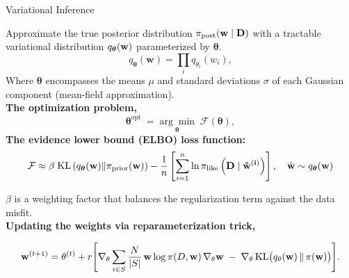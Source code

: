 \documentclass[8pt,xcolor=dvipsnames,compress]{beamer}
\newcommand{\bs}{\boldsymbol}
\begin{document}
%
\begin{frame}{Variational Inference}
\footnotesize

Approximate the true posterior distribution $\pi_{\text{post}}(\bf{w} \mid \bf{D})$ with a tractable variational distribution $q_{\boldsymbol{\theta}}(\bf{w})$ parameterized by $\boldsymbol{\theta}$.
\begin{equation}
q_{\boldsymbol{\theta}}(\mathbf{w}) = \prod_i q_{\theta_i}(w_i),
\end{equation}
Where $\boldsymbol{\theta}$ encompasses the means $\mu$ and standard deviations $\sigma$ of each Gaussian component (mean-field approximation).\\
\vspace{0.07in}
\textbf{The optimization problem,}
\begin{equation}\label{eq:f_opt}
\bs \theta^{\text {opt }}= \underset{\bs \theta}{\arg \min } \; \mathcal{F} (\bs \theta),
\end{equation}
\textbf{The evidence lower bound (ELBO) loss function:}
\begin{equation}\label{eq:elbo}
\mathcal{F} \approx \beta \; \mathrm{KL}\left( q_{\boldsymbol{\theta}}({\mathbf{w}}) \| \pi_{\text{prior}}({\bf w})\right)-\frac{1}{n} \left[\sum_{i=1}^{n} \ln \pi_{\text{like}}\left(\bf{D} \mid \hat{\bf{w}}^{(i)}\right)\right], \quad 
\hat{\bf{w}} \sim q_{\boldsymbol{\theta}}(\mathbf{w})
\end{equation}

$\beta$ is a weighting factor that balances the regularization term against the data misfit.\\
\vspace{0.07in}
\textbf{Updating the weights via reparameterization trick,}

\begin{equation}
{\bf w}^{(t+1)} = \theta^{(t)} + r \Biggl[
\nabla_{\theta} \sum_{i \in S} \frac{N}{|S|}\, {\bf w} \log \pi(D, {\bf w})\, \nabla_{\theta} {\bf w}
\;-\;
\nabla_{\theta}\, \mathrm{KL}\bigl(q_{\theta}({\bf w})\,\|\,\pi({\bf w})\bigr)
\Biggr].
\end{equation}
\end{frame}
%
\end{document}
